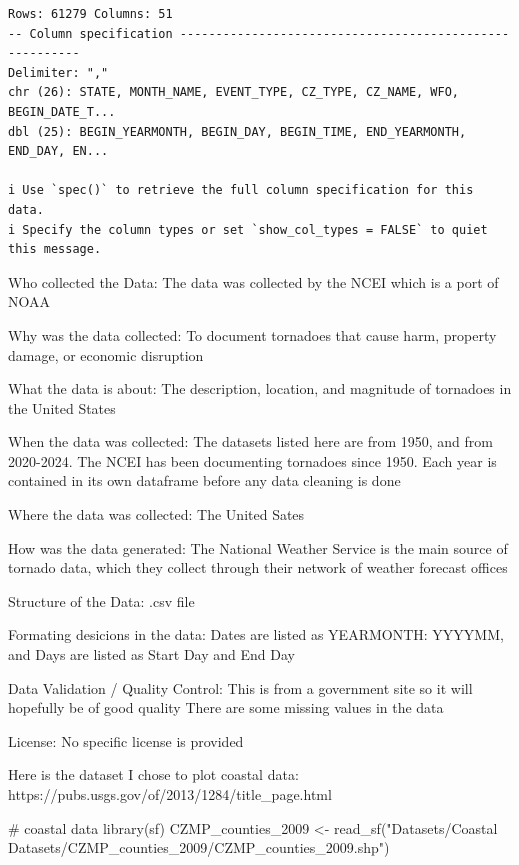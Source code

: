 \documentclass[
  letterpaper,
  DIV=11,
  numbers=noendperiod]{scrreprt}
\newenvironment{Shaded}{\begin{snugshade}}{\end{snugshade}}
\newcommand{\CommentTok}[1]{\textcolor[rgb]{0.37,0.37,0.37}{#1}}
\newcommand{\FunctionTok}[1]{\textcolor[rgb]{0.28,0.35,0.67}{#1}}
\newcommand{\NormalTok}[1]{\textcolor[rgb]{0.00,0.23,0.31}{#1}}
\newcommand{\OtherTok}[1]{\textcolor[rgb]{0.00,0.23,0.31}{#1}}
\newcommand{\StringTok}[1]{\textcolor[rgb]{0.13,0.47,0.30}{#1}}
\begin{document}
\begin{verbatim}
Rows: 61279 Columns: 51
-- Column specification --------------------------------------------------------
Delimiter: ","
chr (26): STATE, MONTH_NAME, EVENT_TYPE, CZ_TYPE, CZ_NAME, WFO, BEGIN_DATE_T...
dbl (25): BEGIN_YEARMONTH, BEGIN_DAY, BEGIN_TIME, END_YEARMONTH, END_DAY, EN...

i Use `spec()` to retrieve the full column specification for this data.
i Specify the column types or set `show_col_types = FALSE` to quiet this message.
\end{verbatim}

Who collected the Data: The data was collected by the NCEI which is a
port of NOAA

Why was the data collected: To document tornadoes that cause harm,
property damage, or economic disruption

What the data is about: The description, location, and magnitude of
tornadoes in the United States

When the data was collected: The datasets listed here are from 1950, and
from 2020-2024. The NCEI has been documenting tornadoes since 1950. Each
year is contained in its own dataframe before any data cleaning is done

Where the data was collected: The United Sates

How was the data generated: The National Weather Service is the main
source of tornado data, which they collect through their network of
weather forecast offices

Structure of the Data: .csv file

Formating desicions in the data: Dates are listed as YEARMONTH: YYYYMM,
and Days are listed as Start Day and End Day

Data Validation / Quality Control: This is from a government site so it
will hopefully be of good quality There are some missing values in the
data

License: No specific license is provided

Here is the dataset I chose to plot coastal data:
https://pubs.usgs.gov/of/2013/1284/title\_page.html

\begin{Shaded}
\begin{Highlighting}[]
\CommentTok{\# coastal data}
\FunctionTok{library}\NormalTok{(sf)}
\NormalTok{CZMP\_counties\_2009 }\OtherTok{\textless{}{-}} 
  \FunctionTok{read\_sf}\NormalTok{(}\StringTok{"Datasets/Coastal Datasets/CZMP\_counties\_2009/CZMP\_counties\_2009.shp"}\NormalTok{)}
\end{Highlighting}
\end{Shaded}
\end{document}
